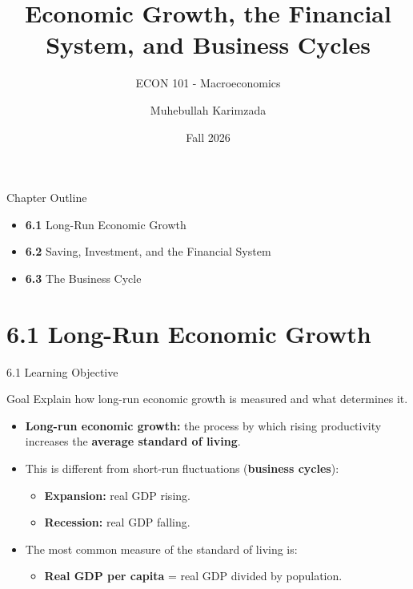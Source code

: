 \documentclass[aspectratio=169]{beamer}
\title{\textbf{Economic Growth, the Financial System, and Business Cycles  \vspace{.5cm}\\  }}
\subtitle{ {\large ECON 101 - Macroeconomics}}
\author{Muhebullah Karimzada}
\date{Fall 2026}
\begin{document}
\begin{frame}[plain]
  \titlepage
\end{frame}

\begin{frame}{Chapter Outline}
\transfade
\begin{itemize}[<+->]
  \item \textbf{6.1} Long-Run Economic Growth
  \item \textbf{6.2} Saving, Investment, and the Financial System
  \item \textbf{6.3} The Business Cycle
\end{itemize}
\end{frame}

\section{6.1 Long-Run Economic Growth}

\begin{frame}{6.1 Learning Objective}
\transfade
\begin{block}{Goal}
Explain how long-run economic growth is measured and what determines it.
\end{block}
\begin{itemize}[<+->]
  \item \textbf{Long-run economic growth:} the process by which rising \alert{productivity} increases the \textbf{average standard of living}.
  \item This is different from short-run fluctuations (\textbf{business cycles}):
  \begin{itemize}[<+->]
    \item \textbf{Expansion:} real GDP rising.
    \item \textbf{Recession:} real GDP falling.
  \end{itemize}
  \item The most common measure of the standard of living is:
  \begin{itemize}[<+->]
    \item \textbf{Real GDP per capita} = real GDP divided by population.
  \end{itemize}
\end{itemize}
\end{frame}
\end{document}

